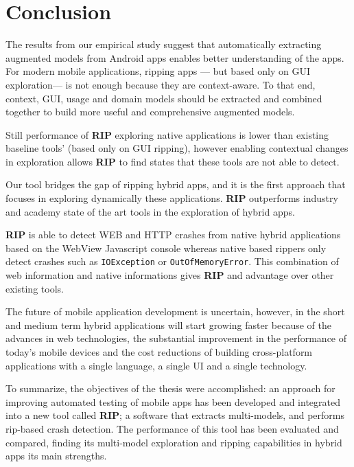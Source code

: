 %
\chapter{Conclusion}
\label{chapter5}

The results from our empirical study suggest that  automatically extracting augmented models from Android apps enables better understanding of the apps. For modern mobile applications, ripping apps --- but based only on GUI exploration--- is not enough because they are context-aware. To that end, context, GUI, usage and domain models should be extracted and combined together to build more useful and comprehensive augmented models.

Still performance of \textbf{RIP} exploring native applications is lower than existing baseline tools' (based only on GUI ripping), however enabling contextual changes in exploration allows \textbf{RIP} to find states that these tools are not able to detect. 

Our tool bridges the gap of ripping hybrid apps, and it is the first approach that focuses in exploring dynamically these applications. \textbf{RIP} outperforms industry and academy state of the art tools in the exploration of hybrid apps.

\textbf{RIP} is able to detect WEB and HTTP crashes from native hybrid applications based on the WebView Javascript console whereas native based rippers only detect crashes such as \texttt{IOException} or \texttt{OutOfMemoryError}. This combination of web information and native informations gives \textbf{RIP} and advantage over other existing tools.

The future of mobile application development is uncertain, however, in the short and medium term hybrid applications will start growing faster because of the advances in web technologies, the substantial improvement in the performance of today's mobile devices and the cost reductions of building cross-platform applications with a single language, a single UI and a single technology.

 To summarize, the objectives of the thesis were accomplished: an approach for improving automated testing of mobile apps has been developed and integrated into a new tool called \textbf{RIP}; a software that extracts multi-models, and performs rip-based crash detection. The performance of this tool has been evaluated and compared, finding its multi-model exploration and ripping capabilities in hybrid apps its main strengths.

